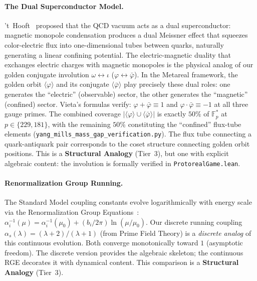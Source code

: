 \paragraph{The Dual Superconductor Model.}
't~Hooft~\cite{thooft1981} proposed that the QCD vacuum acts as a dual superconductor: magnetic monopole condensation produces a dual Meissner effect that squeezes color-electric flux into one-dimensional tubes between quarks, naturally generating a linear confining potential. The electric-magnetic duality that exchanges electric charges with magnetic monopoles is the physical analog of our golden conjugate involution $\omega \leftrightarrow \iota$ ($\varphi \leftrightarrow \bar\varphi$). In the Metareal framework, the golden orbit $\langle\varphi\rangle$ and its conjugate $\langle\bar\varphi\rangle$ play precisely these dual roles: one generates the ``electric'' (observable) sector, the other generates the ``magnetic'' (confined) sector. Vieta's formulas verify: $\varphi + \bar\varphi \equiv 1$ and $\varphi \cdot \bar\varphi \equiv -1$ at all three gauge primes. The combined coverage $|\langle\varphi\rangle \cup \langle\bar\varphi\rangle|$ is exactly $50\%$ of $\mathbb{F}_p^*$ at $p \in \{229, 181\}$, with the remaining $50\%$ constituting the ``confined'' flux-tube elements (\texttt{yang\_mills\_mass\_gap\_verification.py}). The flux tube connecting a quark-antiquark pair corresponds to the coset structure connecting golden orbit positions. This is a \textbf{Structural Analogy} (Tier~3), but one with explicit algebraic content: the involution is formally verified in \texttt{ProtorealGame.lean}.

\paragraph{Renormalization Group Running.}
The Standard Model coupling constants evolve logarithmically with energy scale via the Renormalization Group Equations~\cite{wilczek1973}: $\alpha_i^{-1}(\mu) = \alpha_i^{-1}(\mu_0) + (b_i / 2\pi) \ln(\mu/\mu_0)$. Our discrete running coupling $\alpha_s(\lambda) = (\lambda + 2)/(\lambda + 1)$ (from Prime Field Theory) is a \emph{discrete analog} of this continuous evolution. Both converge monotonically toward $1$ (asymptotic freedom). The discrete version provides the algebraic skeleton; the continuous RGE decorates it with dynamical content. This comparison is a \textbf{Structural Analogy} (Tier~3).

